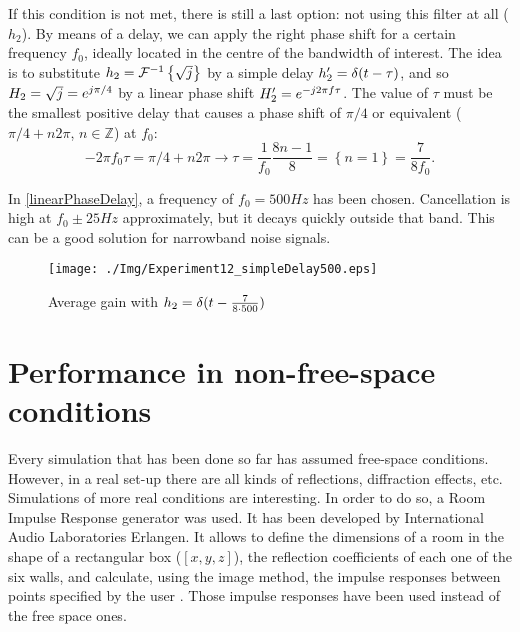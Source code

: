 If this condition is not met, there is still a last option: not using this filter at all ($h_2$). By means of a delay, we can apply the right phase shift for a certain frequency $f_0$, ideally located in the centre of the bandwidth of interest. The idea is to substitute $\freqFilter[time][phase] = \FourierTransform{\sqrt{j}}[inverse]$ by a simple delay $\freqFilter[time][phase]' = \delta(t - \tau)$, and so $\freqFilter[frequency][phase] = \sqrt{j} = e^{j\pi/4}$ by a linear phase shift $\freqFilter[frequency][phase]' = e^{-j2\pi f \tau}$. The value of $\tau$ must be the smallest positive delay that causes a phase shift of $\pi/4$ or equivalent ($\pi/4 + n2\pi$, $n \in \mathbb{Z}$) at $f_0$:
\begin{equation}
	-2\pi f_0 \tau = \pi/4 + n2\pi \rightarrow \tau = \frac{1}{f_0}\frac{8n - 1}{8} = \left\{n = 1\right\} = \frac{7}{8f_0}.
\end{equation}

In \autoref{linearPhaseDelay}, a frequency of $f_0 = 500\si{Hz}$ has been chosen. Cancellation is high at $f_0 \pm 25 \si{Hz}$ approximately, but it decays quickly outside that band. This can be a good solution for narrowband noise signals.

\begin{figure}
	\centering
	\texttt{[image: ./Img/Experiment12\_simpleDelay500.eps]}
	\caption[Average gain with frequency linear phase shift filter]{Average gain with $\freqFilter[time][phase] = \delta(t - \frac{7}{8\cdot 500})$}
	\label{linearPhaseDelay}
\end{figure}


\section{Performance in non-free-space conditions}
Every simulation that has been done so far has assumed free-space conditions. However, in a real set-up there are all kinds of reflections, diffraction effects, etc. Simulations of more real conditions are interesting. In order to do so, a Room Impulse Response generator was used. It has been developed by International Audio Laboratories Erlangen. It allows to define the dimensions of a room in the shape of a rectangular box ($[x,y,z]$), the reflection coefficients of each one of the six walls, and calculate, using the image method, the impulse responses between points specified by the user \cite{RIRgenerator2}. Those impulse responses have been used instead of the free space ones.

